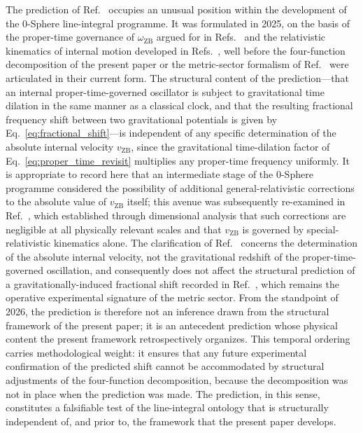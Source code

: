\documentclass[%
 reprint, amsmath,amssymb, aps, prb, ]{revtex4-2}
\numberwithin{equation}{section}
\newcommand{\omZB}{\omega_{\text{ZB}}}
\newcommand{\vZB}{v_{\mathrm{ZB}}}
\begin{document}
The prediction of Ref.~\cite{hanamura22} occupies an unusual position within the development of the 0-Sphere line-integral programme. It was formulated in 2025, on the basis of the proper-time governance of $\omZB$ argued for in Refs.~\cite{hanamura01, hanamura11} and the relativistic kinematics of internal motion developed in Refs.~\cite{hanamura10, hanamura47}, well before the four-function decomposition of the present paper or the metric-sector formalism of Ref.~\cite{hanamura51} were articulated in their current form. The structural content of the prediction---that an internal proper-time-governed oscillator is subject to gravitational time dilation in the same manner as a classical clock, and that the resulting fractional frequency shift between two gravitational potentials is given by Eq.~\eqref{eq:fractional_shift}---is independent of any specific determination of the absolute internal velocity $\vZB$, since the gravitational time-dilation factor of Eq.~\eqref{eq:proper_time_revisit} multiplies any proper-time frequency uniformly. It is appropriate to record here that an intermediate stage of the 0-Sphere programme considered the possibility of additional general-relativistic corrections to the absolute value of $\vZB$ itself; this avenue was subsequently re-examined in Ref.~\cite{hanamura28}, which established through dimensional analysis that such corrections are negligible at all physically relevant scales and that $\vZB$ is governed by special-relativistic kinematics alone. The clarification of Ref.~\cite{hanamura28} concerns the determination of the absolute internal velocity, not the gravitational redshift of the proper-time-governed oscillation, and consequently does not affect the structural prediction of a gravitationally-induced fractional shift recorded in Ref.~\cite{hanamura22}, which remains the operative experimental signature of the metric sector. From the standpoint of 2026, the prediction is therefore not an inference drawn from the structural framework of the present paper; it is an antecedent prediction whose physical content the present framework retrospectively organizes. This temporal ordering carries methodological weight: it ensures that any future experimental confirmation of the predicted shift cannot be accommodated by structural adjustments of the four-function decomposition, because the decomposition was not in place when the prediction was made. The prediction, in this sense, constitutes a falsifiable test of the line-integral ontology that is structurally independent of, and prior to, the framework that the present paper develops.
\end{document}
